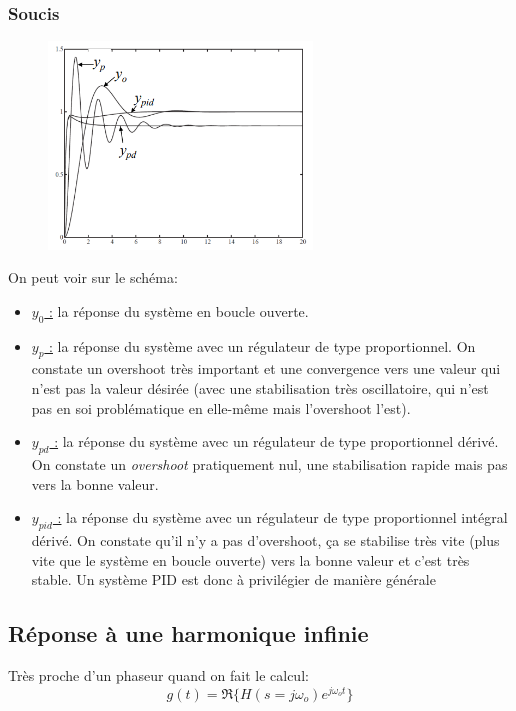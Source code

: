 \documentclass{report}
\begin{document}
\subsubsection{Soucis}
\begin{figure}[H]
\centering
\includegraphics[width=7cm]{img/regu.png}
\end{figure}
On peut voir sur le schéma:
\begin{itemize}
\item \underline{$y_0$ :} la réponse du système en boucle ouverte.
\item \underline{$y_p$ :} la réponse du système avec un régulateur de type proportionnel. On constate un overshoot très important et une convergence vers une valeur qui n’est pas la valeur désirée (avec une stabilisation très oscillatoire, qui n’est pas en soi problématique en elle-même mais l’overshoot l’est).
\item \underline{$y_{pd}$ :} la réponse du système avec un régulateur de type proportionnel dérivé. On constate un \textit{overshoot} pratiquement nul, une stabilisation rapide mais pas vers la bonne valeur.
\item \underline{$y_{pid}$ :} la réponse du système avec un régulateur de type proportionnel intégral dérivé. On constate qu’il n’y a pas d’overshoot, ça se stabilise très vite (plus vite que le système en boucle ouverte) vers la bonne valeur et c’est très stable. Un système PID est donc à
privilégier de manière générale
\end{itemize}

\subsection{Réponse à une harmonique infinie}
Très proche d'un phaseur quand on fait le calcul:
\begin{equation}
g(t) = \mathfrak{R}\{H(s = j \omega_o) e^{j \omega_o t}\}
\end{equation}
\end{document}
